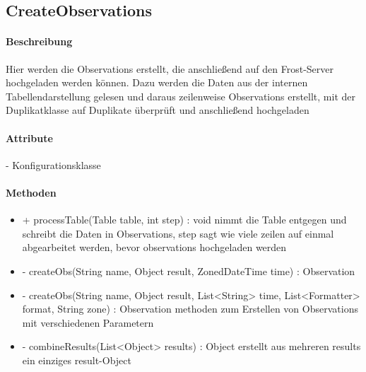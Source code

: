 
\subsection{CreateObservations}

\paragraph{Beschreibung}
Hier werden die Observations erstellt, die anschließend auf den Frost-Server hochgeladen werden können.
Dazu werden die Daten aus der internen Tabellendarstellung gelesen und daraus zeilenweise Observations erstellt, mit der Duplikatklasse auf Duplikate überprüft und anschließend hochgeladen

\paragraph{Attribute}
- Konfigurationsklasse

\paragraph{Methoden}

\begin{itemize}
\item + processTable(Table table, int step) : void
nimmt die Table entgegen und schreibt die Daten in Observations, step sagt wie viele zeilen auf einmal abgearbeitet werden, bevor observations hochgeladen werden
\item - createObs(String name, Object result, ZonedDateTime time) : Observation
\item - createObs(String name, Object result, List<String> time, List<Formatter> format, String zone) : Observation
methoden zum Erstellen von Observations mit verschiedenen Parametern
\item - combineResults(List<Object> results) : Object
erstellt aus mehreren results ein einziges result-Object
\end{itemize}